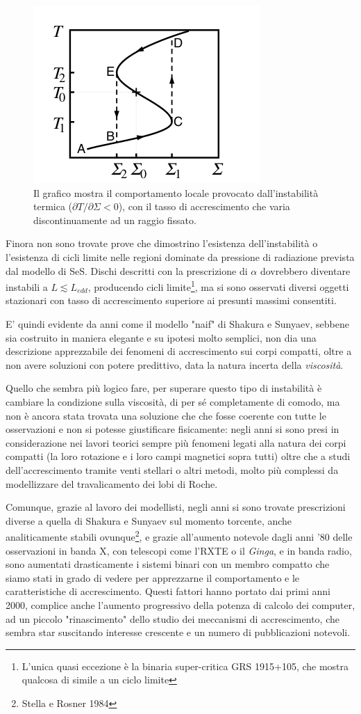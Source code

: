 \documentclass[a4paperbi]{article}
\begin{document}
	\begin{figure}[H]
		\centering
		\includegraphics[width=0.4\linewidth]{CicloLimite}
		\caption{Il grafico mostra il comportamento locale provocato dall'instabilità termica ($\partial T/\partial\Sigma<0$), con il tasso di accrescimento che varia discontinuamente ad un raggio fissato.}
		\label{fig:CicloLimite}
	\end{figure}
	
	Finora non sono trovate prove che dimostrino l'esistenza dell'instabilità o l'esistenza di cicli limite nelle regioni dominate da pressione di radiazione prevista dal modello di SeS. Dischi descritti con la prescrizione di $\alpha$ dovrebbero diventare instabili a $L\lesssim L_{edd}$, producendo cicli limite\footnote{L'unica quasi eccezione è la binaria super-critica GRS 1915+105, che mostra qualcosa di simile a un ciclo limite}, ma si sono osservati diversi oggetti stazionari con tasso di accrescimento superiore ai presunti massimi consentiti.
	
	E' quindi evidente da anni come il modello "naif" di Shakura e Sunyaev, sebbene sia costruito in maniera elegante e su ipotesi molto semplici, non dia una descrizione apprezzabile dei fenomeni di accrescimento sui corpi compatti, oltre a non avere soluzioni con potere predittivo, data la natura incerta della \textit{viscosità}.
	
	Quello che sembra più logico fare, per superare questo tipo di instabilità è cambiare la condizione sulla viscosità, di per sé completamente di comodo, ma non è ancora stata trovata una soluzione che che fosse coerente con tutte le osservazioni e non si potesse giustificare fisicamente: negli anni si sono presi in considerazione nei lavori teorici sempre più fenomeni legati alla natura dei corpi compatti (la loro rotazione e i loro campi magnetici sopra tutti) oltre che a studi dell'accrescimento tramite venti stellari o altri metodi, molto più complessi da modellizzare del travalicamento dei lobi di Roche.
	
	Comunque, grazie al lavoro dei modellisti, negli anni si sono trovate prescrizioni diverse a quella di Shakura e Sunyaev sul momento torcente, anche analiticamente stabili ovunque\footnote{Stella e Rosner 1984}, e grazie all'aumento notevole dagli anni '80 delle osservazioni in banda X, con telescopi come l'RXTE o il \textit{Ginga}, e in banda radio, sono aumentati drasticamente i sistemi binari con un membro compatto che siamo stati in grado di vedere per apprezzarne il comportamento e le caratteristiche di accrescimento. 
	Questi fattori hanno portato dai primi anni 2000, complice anche l'aumento progressivo della potenza di calcolo dei computer, ad un piccolo "rinascimento" dello studio dei meccanismi di accrescimento, che sembra star suscitando interesse crescente e un numero di pubblicazioni notevoli.
	
\end{document}
